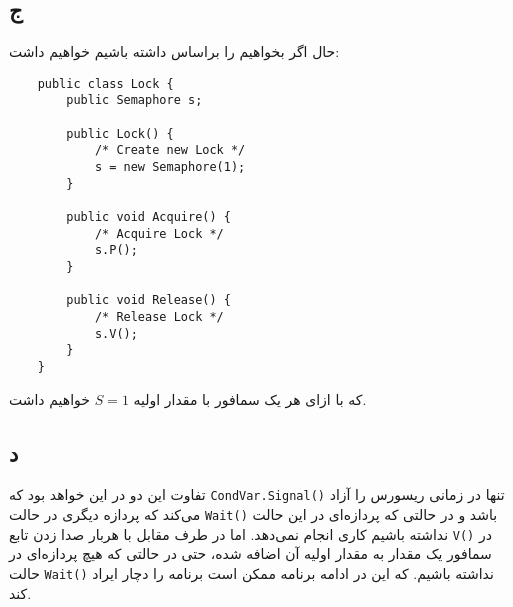 \subsection*{ج}
حال اگر بخواهیم
را براساس
داشته باشیم خواهیم داشت:
\LTR
\begin{verbatim}
    public class Lock {
        public Semaphore s;

        public Lock() {
            /* Create new Lock */
            s = new Semaphore(1);
        }

        public void Acquire() {
            /* Acquire Lock */
            s.P();
        }

        public void Release() {
            /* Release Lock */
            s.V();
        }
    }
\end{verbatim}
\RTL
که با ازای هر
یک سمافور با مقدار اولیه
$S = 1$
خواهیم داشت.

\subsection*{د}
تفاوت این دو در این خواهد بود که
\verb|CondVar.Signal()|
تنها در زمانی ریسورس را آزاد می‌کند که پردازه دیگری در حالت
\verb|Wait()|
باشد و در حالتی که پردازه‌ای در این حالت نداشته باشیم کاری انجام نمی‌دهد. اما در طرف مقابل با هربار صدا زدن تابع
\verb|V()|
در سمافور یک مقدار به مقدار اولیه آن اضافه شده، حتی در حالتی که هیچ پردازه‌ای در حالت
\verb|Wait()|
نداشته باشیم. که این در ادامه برنامه ممکن است برنامه را دچار ایراد کند.

